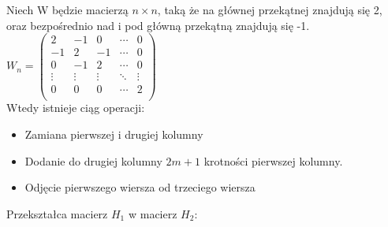  Niech W będzie macierzą $n \times n$, taką że na głównej przekątnej znajdują się 2, oraz bezpośrednio nad i pod główną przekątną znajdują się -1. \\
 $
 W_{n}=\begin{pmatrix}
2 & -1 & 0 & \cdots & 0 \\
-1& 2 & -1 & \cdots & 0 \\
0 &-1 &  2 & \cdots & 0 \\
\vdots & \vdots & \vdots & \ddots & \vdots \\
0 & 0 & 0 &\cdots & 2 \\
 \end{pmatrix}
 $ \\
 Wtedy istnieje ciąg operacji:
\begin{itemize}
\item Zamiana pierwszej i drugiej kolumny
\item Dodanie do drugiej kolumny $2m+1$ krotności pierwszej kolumny.
\item Odjęcie pierwszego wiersza od trzeciego wiersza
\end{itemize}
Przekształca macierz $H_{1}$ w macierz $H_{2}$:

